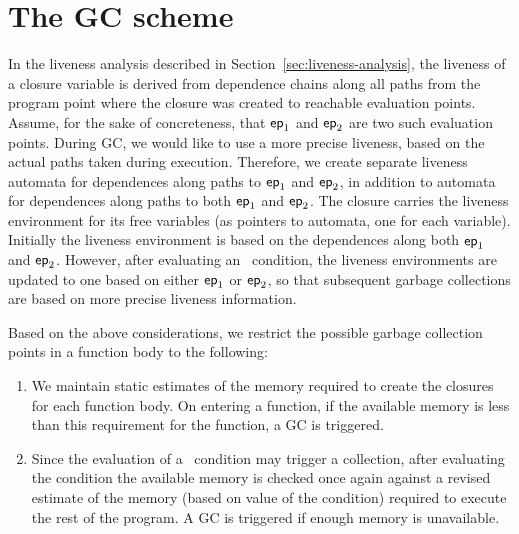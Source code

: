 \documentclass[9pt,nonatbib]{sigplanconf}
\begin{document}
\section{The GC scheme}
\label{sec:GC-scheme}

In        the       liveness        analysis       described        in
Section~\ref{sec:liveness-analysis},   the  liveness   of  a   closure
variable is  derived from dependence  chains along all paths  from the
program point  where the closure  was created to  reachable evaluation
points.  Assume,  for the  sake of  concreteness, that  $\mathsf{ep}_1$ and
$\mathsf{ep}_2$ are two such evaluation points.  During GC,
we would like to use a more precise liveness, based on the actual paths
taken  during  execution.   Therefore,   we  create  separate  liveness
automata for dependences  along paths to $\mathsf{ep}_1$  and $\mathsf{ep}_2$, in
addition to  automata for dependences  along paths to  both $\mathsf{ep}_1$
and $\mathsf{ep}_2$.  The closure carries  the liveness environment for its
free  variables (as  pointers  to automata,  one  for each  variable).
Initially the liveness  environment is based on  the dependences along
both  $\mathsf{ep}_1$   and  $\mathsf{ep}_2$.   However,  after   evaluating  an
\SIF\ condition, the liveness environments are updated to one based on
either   $\mathsf{ep}_1$  or   $\mathsf{ep}_2$,  so   that  subsequent   garbage
collections are based on more precise liveness information.

Based on  the above considerations,  we restrict the  possible garbage
collection points in a function body to the following:
\begin{enumerate}
\item We  maintain static estimates  of the memory required  to create
  the closures for each function body.  On entering a function, if the
  available memory is  less than this requirement for  the function, a
  GC is triggered.
\item Since the evaluation of a  \SIF\ condition may trigger a 
  collection, after evaluating the condition   the available memory
  is  checked once  again against  a  revised estimate  of the  memory
  (based on  value of the condition)  required to execute the  rest of
  the program.  A GC is triggered if enough memory is unavailable.
\end{enumerate}



\end{document}
